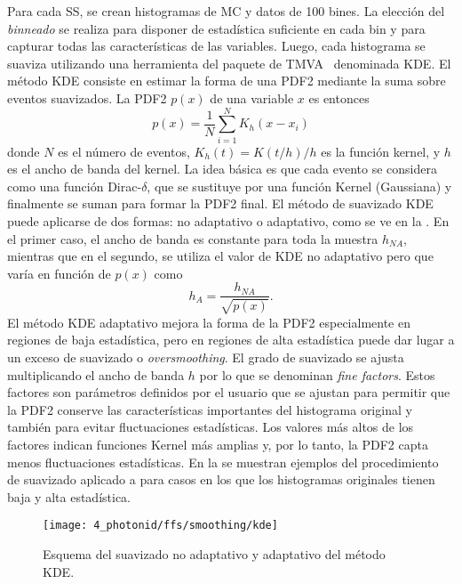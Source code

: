 Para cada \ac{SS}, se crean histogramas de \ac{MC} y datos de 100 bines. La elección del \textit{binneado} se realiza para disponer de estadística suficiente en cada bin y para capturar todas las características de las variables.
Luego, cada histograma se suaviza utilizando una herramienta del paquete de TMVA~\cite{TMVA} denominada \acf{KDE}. El método \ac{KDE} consiste en estimar la forma de una \acf{PDF2} mediante la suma sobre eventos suavizados. La \ac{PDF2} \(p(x)\) de una variable \(x\) es entonces
\begin{equation*}
	p(x) = \frac{1}{N}\sum_{i=1}^{N} K_h(x-x_i)
\end{equation*}
donde \(N\) es el número de eventos, \(K_h(t) = K(t/h)/h\) es la función kernel, y \(h\) es el ancho de banda del kernel. La idea básica es que cada evento se considera como una función Dirac-\(\delta\), que se sustituye por una función Kernel (Gaussiana) y finalmente se suman para formar la \ac{PDF2} final. El m\'etodo de suavizado \ac{KDE} puede aplicarse de dos formas: no adaptativo o adaptativo, como se ve en la \Fig{\ref{fig:ss_corrections:ffs:calculation:adaptive_nonadaptive_kde}}. En el primer caso, el ancho de banda es constante para toda la muestra \(h_{NA}\), mientras que en el segundo, se utiliza el valor de \ac{KDE} no adaptativo pero que varía en función de \(p(x)\) como
\begin{equation*}
	h_A = \frac{h_{NA}}{\sqrt{p(x)}}.
\end{equation*}
El m\'etodo \ac{KDE} adaptativo mejora la forma de la \ac{PDF2} especialmente en regiones de baja estadística, pero en regiones de alta estadística puede dar lugar a un exceso de suavizado o \textit{oversmoothing}. El grado de suavizado se ajusta multiplicando el ancho de banda \(h\) por lo que se denominan \textit{fine factors}.
Estos factores son parámetros definidos por el usuario que se ajustan para permitir que la \ac{PDF2} conserve las características importantes del histograma original y también para evitar fluctuaciones estadísticas. Los valores más altos de los factores indican funciones Kernel más amplias y, por lo tanto, la \ac{PDF2} capta menos fluctuaciones estadísticas.
En la \Fig{\ref{fig:ss_corrections:ffs:calculation:smoothing_ss}} se muestran ejemplos del procedimiento de suavizado aplicado a \rhad para casos en los que los histogramas originales tienen baja y alta estadística.

\begin{figure}[ht!]
    \centering
    \texttt{[image: 4\_photonid/ffs/smoothing/kde]}
    \caption{Esquema del suavizado no adaptativo y adaptativo del m\'etodo \ac{KDE}.}
    \label{fig:ss_corrections:ffs:calculation:adaptive_nonadaptive_kde}
\end{figure}

